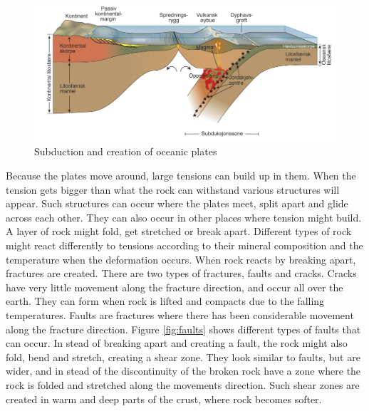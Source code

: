 \documentclass[a4paper,12pt]{report}
\begin{document}
\begin{figure}
 \includegraphics[width=\linewidth]{thesis/geo/fig99subduction.png}
 \caption{Subduction and creation of oceanic plates}
 \label{fig:fig99subduction}
\end{figure}

Because the plates move around, large tensions can build up in them. When the tension gets bigger than what the rock can withstand various structures will appear. Such structures can occur where the plates meet, split apart and glide across each other. They can also occur in other places where tension might build. A layer of rock might fold, get stretched or break apart. Different types of rock might react differently to tensions according to their mineral composition and the temperature when the deformation occurs. When rock reacts by breaking apart, fractures are created. There are two types of fractures, faults and cracks. Cracks have very little movement along the fracture direction, and occur all over the earth. They can form when rock is lifted and compacts due to the falling temperatures. Faults are fractures where there has been considerable movement along the fracture direction. Figure \ref{fig:faults} shows different types of faults that can occur. In stead of breaking apart and creating a fault, the rock might also fold, bend and stretch, creating a shear zone. They look similar to faults, but are wider, and in stead of the discontinuity of the broken rock have a zone where the rock is folded and stretched along the movements direction. Such shear zones are created in warm and deep parts of the crust, where rock becomes softer.
\end{document}
